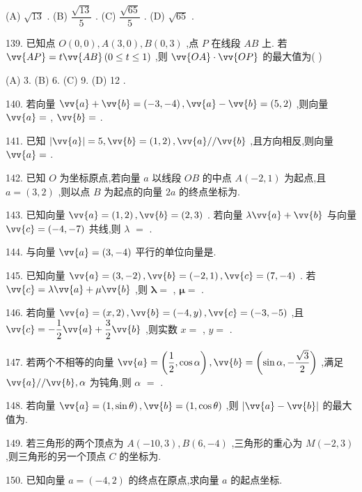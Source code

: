 (A) $\sqrt{13}$ . (B) $\dfrac{\sqrt{13}}{5}$ . (C) $\dfrac{\sqrt{65}}{5}$ . (D) $\sqrt{65}$ .

139. 已知点 $O\left( {0,0}\right) ,A\left( {3,0}\right) ,B\left( {0,3}\right)$ ,点 $P$ 在线段 ${AB}$ 上. 若 $\vv{AP} = t\vv{AB}\left( {0 \leq  t \leq  1}\right)$ ,则 $\vv{OA} \cdot  \vv{OP}$ 的最大值为(   )

(A) 3. (B) 6. (C) 9. (D) 12 .

140. 若向量 $\vv{a} + \vv{b} = \left( {-3, - 4}\right) ,\vv{a} - \vv{b} = \left( {5,2}\right)$ ,则向量 $\vv{a} =$ \blkda{}, $\vv{b} =$ \blkda{}.

141. 已知 $\left| \vv{a}\right|  = 5,\vv{b} = \left( {1,2}\right) ,\vv{a}//\vv{b}$ ,且方向相反,则向量 $\vv{a} =$ \blkda{}.

142. 已知 $O$ 为坐标原点,若向量 $a$ 以线段 ${OB}$ 的中点 $A\left( {-2,1}\right)$ 为起点,且 $a = \left( {3,2}\right)$ ,则以点 $B$ 为起点的向量 ${2a}$ 的终点坐标为\blkda{}.

143. 已知向量 $\vv{a} = \left( {1,2}\right) ,\vv{b} = \left( {2,3}\right)$ . 若向量 $\lambda \vv{a} + \vv{b}$ 与向量 $\vv{c} = \left( {-4, - 7}\right)$ 共线,则 $\lambda$  $=$ \blkda{}.

144. 与向量 $\vv{a} = \left( {3, - 4}\right)$ 平行的单位向量是\blkda{}.

145. 已知向量 $\vv{a} = \left( {3, - 2}\right) ,\vv{b} = \left( {-2,1}\right) ,\vv{c} = \left( {7, - 4}\right)$ . 若 $\vv{c} = \mathbf{\lambda }\vv{a} + \mathbf{\mu }\vv{b}$ ,则 $\mathbf{\lambda } =$ \blkda{}, $\mathbf{\mu } =$ \blkda{}.

146. 若向量 $\vv{a} = \left( {x,2}\right) ,\vv{b} = \left( {-4,y}\right) ,\vv{c} = \left( {-3, - 5}\right)$ ,且 $\vv{c} =  - \dfrac{1}{2}\vv{a} + \dfrac{3}{2}\vv{b}$ ,则实数 $x =$ \blkda{}, $y =$ \blkda{}.

147. 若两个不相等的向量 $\vv{a} = \left( {\dfrac{1}{2},\cos \alpha }\right) ,\vv{b} = \left( {\sin \alpha , - \dfrac{\sqrt{3}}{2}}\right)$ ,满足 $\vv{a}//\vv{b},\alpha$ 为钝角,则 $\alpha$  $=$ \blkda{}.

148. 若向量 $\vv{a} = \left( {1,\sin \theta }\right) ,\vv{b} = \left( {1,\cos \theta }\right)$ ,则 $\left| {\vv{a} - \vv{b}}\right|$ 的最大值为\blkda{}.

149. 若三角形的两个顶点为 $A\left( {-{10},3}\right) ,B\left( {6, - 4}\right)$ ,三角形的重心为 $M\left( {-2,3}\right)$ ,则三角形的另一个顶点 $C$ 的坐标为\blkda{}.

150. 已知向量 $a = \left( {-4,2}\right)$ 的终点在原点,求向量 $a$ 的起点坐标.

